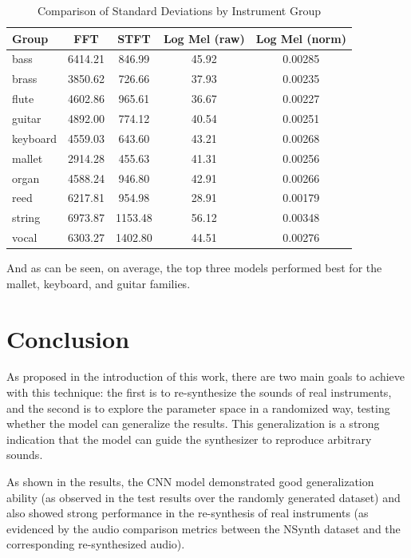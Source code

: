 \documentclass[sigconf,natbib=false]{acmart}
\begin{document}
\begin{table}
  \caption{Comparison of Standard Deviations by Instrument Group}
  \label{tab:std_by_group}
  \begin{tabular}{lcccc}
    \toprule
    Group & FFT & STFT & Log Mel (raw) & Log Mel (norm) \\
    \midrule
    bass     & 6414.21 & 846.99  & 45.92 & 0.00285 \\
    brass    & 3850.62 & 726.66  & 37.93 & 0.00235 \\
    flute    & 4602.86 & 965.61  & 36.67 & 0.00227 \\
    guitar   & 4892.00 & 774.12  & 40.54 & 0.00251 \\
    keyboard & 4559.03 & 643.60  & 43.21 & 0.00268 \\
    mallet   & 2914.28 & 455.63  & 41.31 & 0.00256 \\
    organ    & 4588.24 & 946.80  & 42.91 & 0.00266 \\
    reed     & 6217.81 & 954.98  & 28.91 & 0.00179 \\
    string   & 6973.87 & 1153.48 & 56.12 & 0.00348 \\
    vocal    & 6303.27 & 1402.80 & 44.51 & 0.00276 \\
    \bottomrule
  \end{tabular}
\end{table}

And as can be seen, on average, the top three models performed best for the mallet, keyboard, and guitar families.

\section{Conclusion}
As proposed in the introduction of this work, there are two main goals to achieve with this technique: the first is to re-synthesize the sounds of real instruments, and the second is to explore the parameter space in a randomized way, testing whether the model can generalize the results. This generalization is a strong indication that the model can guide the synthesizer to reproduce arbitrary sounds.

As shown in the results, the CNN model demonstrated good generalization ability (as observed in the test results over the randomly generated dataset) and also showed strong performance in the re-synthesis of real instruments (as evidenced by the audio comparison metrics between the NSynth dataset and the corresponding re-synthesized audio).
\end{document}
